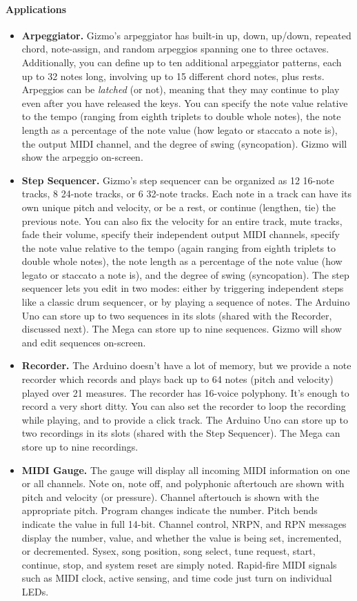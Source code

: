 \documentclass{article}
\begin{document}
\paragraph{Applications}
\begin{itemize}
\item {\bf Arpeggiator.}  Gizmo's arpeggiator has built-in up, down, up/down, repeated chord, note-assign, and random arpeggios spanning one to three octaves.  Additionally, you can define up to ten additional arpeggiator patterns, each up to 32 notes long, involving up to 15 different chord notes, plus rests.  Arpeggios can be {\it latched} (or not), meaning that they may continue to play even after you have released the keys.  You can specify  the note value relative to the tempo (ranging from eighth triplets to double whole notes), the note length as a percentage of the note value (how legato or staccato a note is), the output MIDI channel, and the degree of swing (syncopation).  Gizmo will show the arpeggio on-screen.
\item {\bf Step Sequencer.}  Gizmo's step sequencer can be organized as 12 16-note tracks, 8 24-note tracks, or 6 32-note tracks.  Each note in a track can have its own unique pitch and velocity, or be a rest, or continue (lengthen, tie) the previous note.  You can also fix the velocity for an entire track, mute tracks, fade their volume, specify their independent output MIDI channels, specify the note value relative to the tempo (again ranging from eighth triplets to double whole notes), the note length as a percentage of the note value (how legato or staccato a note is), and the degree of swing (syncopation).    The step sequencer lets you edit in two modes: either by triggering independent steps like a classic drum sequencer, or by playing a sequence of notes.  The Arduino Uno can store up to two sequences in its slots (shared with the Recorder, discussed next).  The Mega can store up to nine sequences.  Gizmo will show and edit sequences on-screen.
\item {\bf Recorder.}  The Arduino doesn't have a lot of memory, but we provide a note recorder which records and plays back up to 64 notes (pitch and velocity) played over 21 measures. The recorder has 16-voice polyphony.   It's enough to record a very short ditty.  You can also set the recorder to loop the recording while playing, and to provide a click track.  The Arduino Uno can store up to two recordings in its slots (shared with the Step Sequencer).  The Mega can store up to nine recordings.
\item {\bf MIDI Gauge.}  The gauge will display all incoming MIDI information on one or all channels.  Note on, note off, and polyphonic aftertouch are shown with pitch and velocity (or pressure).  Channel aftertouch is shown with the appropriate pitch.  Program changes indicate the number.  Pitch bends indicate the value in full 14-bit.  Channel control, NRPN, and RPN messages display the number, value, and whether the value is being set, incremented, or decremented.  Sysex, song position, song select, tune request, start, continue, stop, and system reset are simply noted.  Rapid-fire MIDI signals such as MIDI clock, active sensing, and time code just turn on individual LEDs.

\end{itemize}
\end{document}
